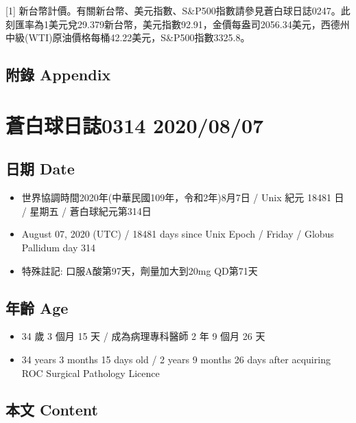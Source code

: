 \documentclass[a5paper, 11pt
]{book}
\providecommand{\tightlist}{%
  \setlength{\itemsep}{0pt}\setlength{\parskip}{0pt}}
\begin{document}
{[}1{]}
新台幣計價。有關新台幣、美元指數、S\&P500指數請參見蒼白球日誌0247。此刻匯率為1美元兌29.379新台幣，美元指數92.91，金價每盎司2056.34美元，西德州中級(WTI)原油價格每桶42.22美元，S\&P500指數3325.8。

\hypertarget{ux9644ux9304-appendix-57}{%
\subsection{附錄 Appendix}\label{ux9644ux9304-appendix-57}}

\hypertarget{ux84bcux767dux7403ux65e5ux8a8c0314-20200807}{%
\section{蒼白球日誌0314
2020/08/07}\label{ux84bcux767dux7403ux65e5ux8a8c0314-20200807}}

\hypertarget{ux65e5ux671f-date-58}{%
\subsection{日期 Date}\label{ux65e5ux671f-date-58}}

\begin{itemize}
\tightlist
\item
  世界協調時間2020年(中華民國109年，令和2年)8月7日 / Unix 紀元 18481 日
  / 星期五 / 蒼白球紀元第314日
\item
  August 07, 2020 (UTC) / 18481 days since Unix Epoch / Friday / Globus
  Pallidum day 314
\item
  特殊註記: 口服A酸第97天，劑量加大到20mg QD第71天
\end{itemize}

\hypertarget{ux5e74ux9f61-age-58}{%
\subsection{年齡 Age}\label{ux5e74ux9f61-age-58}}

\begin{itemize}
\tightlist
\item
  34 歲 3 個月 15 天 / 成為病理專科醫師 2 年 9 個月 26 天
\item
  34 years 3 months 15 days old / 2 years 9 months 26 days after
  acquiring ROC Surgical Pathology Licence
\end{itemize}

\hypertarget{ux672cux6587-content-58}{%
\subsection{本文 Content}\label{ux672cux6587-content-58}}
\end{document}
